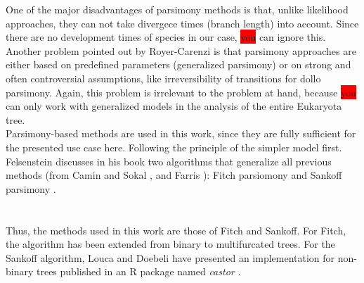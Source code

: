     One of the major disadvantages of parsimony methods is that, unlike likelihood approaches, they 
      can not take divergece times (branch length) into account. Since there are no development times 
      of species in our case, \colorbox{red}{you} can ignore this. \\
    Another problem pointed out by Royer-Carenzi is that parsimony approaches are either based on 
      predefined parameters (generalized parsimony) or on strong and often controversial assumptions, 
      like irreversibility of transitions for dollo parsimony. Again, this problem is irrelevant to 
      the problem at hand, because \colorbox{red}{you} can only work with generalized models in the 
      analysis of the entire Eukaryota tree. \\

    Parsimony-based methods are used in this work, since they are fully sufficient for the presented 
      use case here. Following the principle of the simpler model first. \\
    Felsenstein \cite{Felsenstein2003} discusses in his book two algorithms that generalize all 
      previous methods (from Camin and Sokal \cite{Camin1965},  and Farris 
      \cite{Farris1970}): Fitch parsiomony \cite{Fitch1971} and Sankoff parsimony \cite{Sankoff1975}. \\
     \\
     \\
    
    Thus, the methods used in this work are those of Fitch and Sankoff. For Fitch, the algorithm has 
      been extended from binary to multifurcated trees. For the Sankoff algorithm, Louca and Doebeli 
      have presented an implementation for non-binary trees published in an R package named 
      \textit{castor} \cite{Louca2017}.

